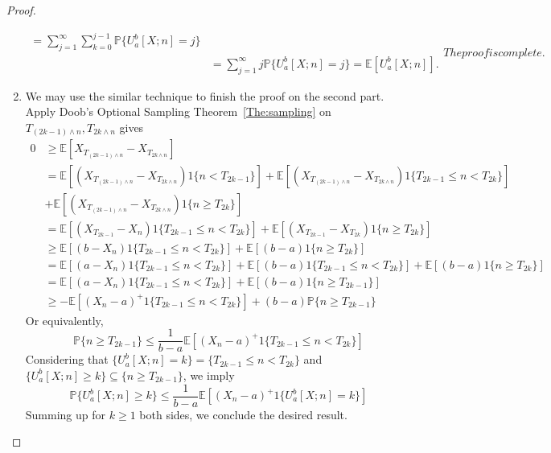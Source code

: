 \begin{proof}
\begin{enumerate}
\begin{subequations}
\begin{align*}
=
\sum_{j=1}^{\infty}\sum_{k=0}^{j-1}\mathbb{P}\{U_a^b[X;n] = j\}
\\&=\sum_{j=1}^{\infty}j\mathbb{P}\{U_a^b[X;n] = j\}=\mathbb{E}[U_a^b[X;n]].
\end{align*}
The proof is complete.
\end{subequations}
\item
We may use the similar technique to finish the proof on the second part.
Apply Doob's Optional Sampling Theorem~\ref{The:sampling} on $T_{(2k-1)\land n},T_{2k\land n}$
 gives
 \begin{align}
0&\ge \mathbb{E}[X_{T_{(2k-1)\land n}} - X_{T_{2k\land n}}]\nonumber\\
&=\mathbb{E}[(X_{T_{(2k-1)\land n}} - X_{T_{2k\land n}})1\{n<T_{2k-1}\}]
+
\mathbb{E}[(X_{T_{(2k-1)\land n}} - X_{T_{2k\land n}})1\{T_{2k-1}\le n<T_{2k}\}]
\nonumber\\&+
\mathbb{E}[(X_{T_{(2k-1)\land n}} - X_{T_{2k\land n}})1\{n\ge T_{2k}\}]\nonumber\\
&=\mathbb{E}[(X_{T_{2k-1}} - X_{n})1\{T_{2k-1}\le n<T_{2k}\}]
+
\mathbb{E}[(X_{T_{2k-1}} - X_{T_{2k}})1\{n\ge T_{2k}\}]\nonumber\\
&\ge
\mathbb{E}[(b - X_n)1\{T_{2k-1}\le n<T_{2k}\}] + \mathbb{E}[(b-a)1\{n\ge T_{2k}\}]\nonumber\\
&
=
\mathbb{E}[(a - X_n)1\{T_{2k-1}\le n<T_{2k}\}] + 
\mathbb{E}[(b-a)1\{T_{2k-1}\le n<T_{2k}\}] + 
\mathbb{E}[(b-a)1\{n\ge T_{2k}\}]\nonumber\\
 &=\mathbb{E}[(a - X_n)1\{T_{2k-1}\le n<T_{2k}\}] + \mathbb{E}[(b-a)1\{n\ge T_{2k-1}\}]\nonumber
 \\
 &\ge
 -\mathbb{E}[(X_n-a)^+1\{T_{2k-1}\le n<T_{2k}\}] + (b-a)\mathbb{P}\{n\ge T_{2k-1}\}\nonumber
% 
\end{align}
Or equivalently, 
\[
\mathbb{P}\{n\ge T_{2k-1}\}\le \frac{1}{b-a}\mathbb{E}[(X_n-a)^+1\{T_{2k-1}\le n<T_{2k}\}]
\]
Considering that $\{U_a^b[X;n] = k\} = \{T_{2k-1}\le n<T_{2k}\}$ and $\{U_a^b[X;n] \ge k\} \subseteq \{n\ge T_{2k-1}\}$, we imply
\[
\mathbb{P}\{U_a^b[X;n] \ge k\}\le \frac{1}{b-a}\mathbb{E}[(X_n-a)^+1\{U_a^b[X;n] = k\}]
\]
Summing up for $k\ge1$ both sides, we conclude the desired result.
\end{enumerate}
\end{proof}

